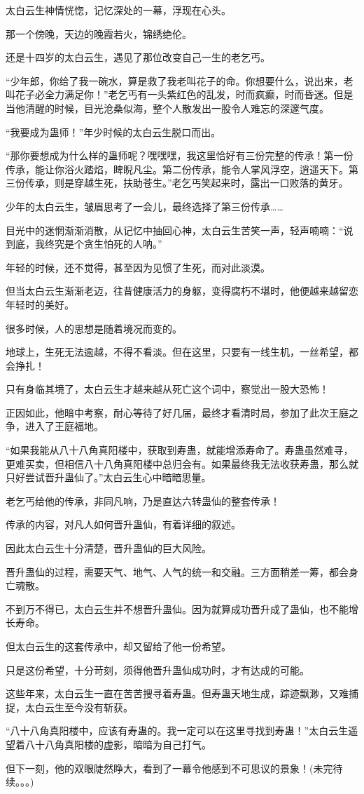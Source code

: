 \begin{this_body}
太白云生神情恍惚，记忆深处的一幕，浮现在心头。

那一个傍晚，天边的晚霞若火，锦绣绝伦。

还是十四岁的太白云生，遇见了那位改变自己一生的老乞丐。

“少年郎，你给了我一碗水，算是救了我老叫花子的命。你想要什么，说出来，老叫花子必全力满足你！”老乞丐有一头紫红色的乱发，时而疯癫，时而昏迷。但是当他清醒的时候，目光沧桑似海，整个人散发出一股令人难忘的深邃气度。

“我要成为蛊师！”年少时候的太白云生脱口而出。

“那你要想成为什么样的蛊师呢？嘿嘿嘿，我这里恰好有三份完整的传承！第一份传承，能让你浴火踏焰，睥睨凡尘。第二份传承，能令人掌风浮空，逍遥天下。第三份传承，则是穿越生死，扶助苍生。”老乞丐笑起来时，露出一口败落的黄牙。

少年的太白云生，皱眉思考了一会儿，最终选择了第三份传承……

目光中的迷惘渐渐消散，从记忆中抽回心神，太白云生苦笑一声，轻声喃喃：“说到底，我终究是个贪生怕死的人呐。”

年轻的时候，还不觉得，甚至因为见惯了生死，而对此淡漠。

但当太白云生渐渐老迈，往昔健康活力的身躯，变得腐朽不堪时，他便越来越留恋年轻时的美好。

很多时候，人的思想是随着境况而变的。

地球上，生死无法逾越，不得不看淡。但在这里，只要有一线生机，一丝希望，都会挣扎！

只有身临其境了，太白云生才越来越从死亡这个词中，察觉出一股大恐怖！

正因如此，他暗中考察，耐心等待了好几届，最终才看清时局，参加了此次王庭之争，进入了王庭福地。

“如果我能从八十八角真阳楼中，获取到寿蛊，就能增添寿命了。寿蛊虽然难寻，更难买卖，但相信八十八角真阳楼中总归会有。如果最终我无法收获寿蛊，那么就只好尝试晋升蛊仙了。”太白云生心中暗暗思量。

老乞丐给他的传承，非同凡响，乃是直达六转蛊仙的整套传承！

传承的内容，对凡人如何晋升蛊仙，有着详细的叙述。

因此太白云生十分清楚，晋升蛊仙的巨大风险。

晋升蛊仙的过程，需要天气、地气、人气的统一和交融。三方面稍差一筹，都会身亡魂散。

不到万不得已，太白云生并不想晋升蛊仙。因为就算成功晋升成了蛊仙，也不能增长寿命。

但太白云生的这套传承中，却又留给了他一份希望。

只是这份希望，十分苛刻，须得他晋升蛊仙成功时，才有达成的可能。

这些年来，太白云生一直在苦苦搜寻着寿蛊。但寿蛊天地生成，踪迹飘渺，又难捕捉，太白云生至今没有斩获。

“八十八角真阳楼中，应该有寿蛊的。我一定可以在这里寻找到寿蛊！”太白云生遥望着八十八角真阳楼的虚影，暗暗为自己打气。

但下一刻，他的双眼陡然睁大，看到了一幕令他感到不可思议的景象！(未完待续。。。)

\end{this_body}

